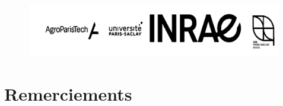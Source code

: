 \documentclass{book}
\begin{document}
\vspace{1.2cm}
\begin{center}
    \includegraphics[height=2.3cm, width=15cm]{logosBW.png}
\end{center}


\newpage
\thispagestyle{empty}
\mbox{} %


\newpage
{}



\chapter*{Remerciements}
\end{document}
